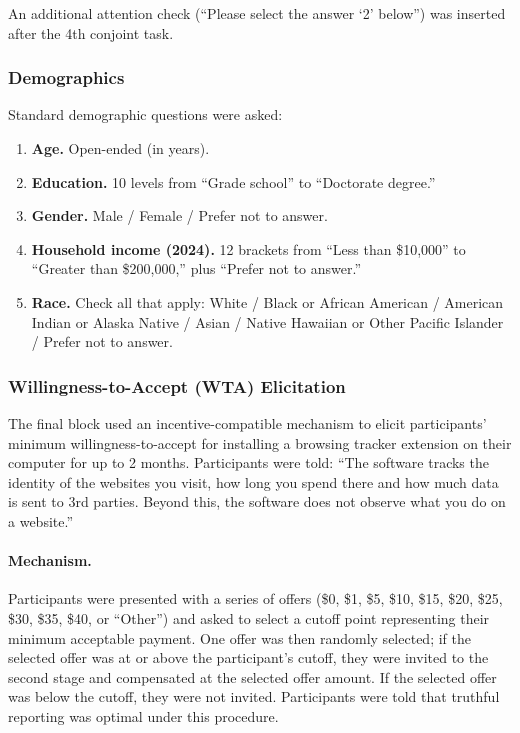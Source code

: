 \documentclass[12pt]{article}
\theoremstyle{definition}
\theoremstyle{remark}
\begin{document}
\begin{appendix}
An additional attention check (``Please select the answer `2' below'') was inserted after the 4th conjoint task.

\subsubsection{Demographics}\label{sec:survey_demographics}

Standard demographic questions were asked:

\begin{enumerate}[leftmargin=*,itemsep=2pt]
    \item \textbf{Age.} Open-ended (in years).
    \item \textbf{Education.} 10 levels from ``Grade school'' to ``Doctorate degree.''
    \item \textbf{Gender.} Male / Female / Prefer not to answer.
    \item \textbf{Household income (2024).} 12 brackets from ``Less than \$10,000'' to ``Greater than \$200,000,'' plus ``Prefer not to answer.''
    \item \textbf{Race.} Check all that apply: White / Black or African American / American Indian or Alaska Native / Asian / Native Hawaiian or Other Pacific Islander / Prefer not to answer.
\end{enumerate}

\subsubsection{Willingness-to-Accept (WTA) Elicitation}\label{sec:survey_wta}

The final block used an incentive-compatible mechanism to elicit participants' minimum willingness-to-accept for installing a browsing tracker extension on their computer for up to 2 months. Participants were told: ``The software tracks the identity of the websites you visit, how long you spend there and how much data is sent to 3rd parties. Beyond this, the software does not observe what you do on a website.''

\paragraph{Mechanism.} Participants were presented with a series of offers (\$0, \$1, \$5, \$10, \$15, \$20, \$25, \$30, \$35, \$40, or ``Other'') and asked to select a cutoff point representing their minimum acceptable payment. One offer was then randomly selected; if the selected offer was at or above the participant's cutoff, they were invited to the second stage and compensated at the selected offer amount. If the selected offer was below the cutoff, they were not invited. Participants were told that truthful reporting was optimal under this procedure.


\end{appendix}
\end{document}
